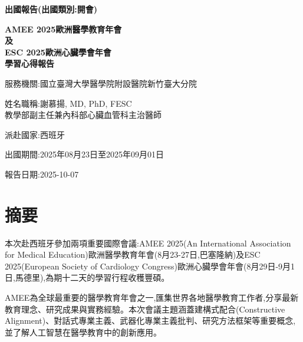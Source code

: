 \documentclass[12pt,a4paper]{article}
\begin{document}
\begin{titlepage}
    {\fontsize{20pt}{24pt}\selectfont\bfseries 出國報告(出國類別:開會)\par}
    
    \vspace{2.5cm}
    
    \centering
    {\fontsize{26pt}{31pt}\selectfont\bfseries AMEE 2025歐洲醫學教育年會\\及\\ESC 2025歐洲心臟學會年會\\學習心得報告\par}
    
    \vspace{3.5cm}
    
    {\fontsize{14pt}{18pt}\selectfont
    服務機關:國立臺灣大學醫學院附設醫院新竹臺大分院\par
    \vspace{0.3cm}
    姓名職稱:謝慕揚, MD, PhD, FESC\\
    \hspace{2.5cm}教學部副主任兼內科部心臟血管科主治醫師\par
    \vspace{0.3cm}
    派赴國家:西班牙\par
    \vspace{0.3cm}
    出國期間:2025年08月23日至2025年09月01日\par
    \vspace{0.3cm}
    報告日期:2025-10-07\par
    }
\end{titlepage}

\newpage

\section*{摘要}

本次赴西班牙參加兩項重要國際會議:AMEE 2025(An International Association for Medical Education)歐洲醫學教育年會(8月23-27日,巴塞隆納)及ESC 2025(European Society of Cardiology Congress)歐洲心臟學會年會(8月29日-9月1日,馬德里),為期十二天的學習行程收穫豐碩。

AMEE為全球最重要的醫學教育年會之一,匯集世界各地醫學教育工作者,分享最新教育理念、研究成果與實務經驗。本次會議主題涵蓋建構式配合(Constructive Alignment)、對話式專業主義、武器化專業主義批判、研究方法框架等重要概念,並了解人工智慧在醫學教育中的創新應用。
\end{document}
